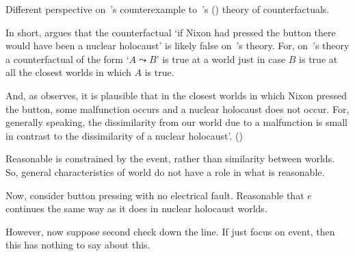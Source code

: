 \begin{note}
  Different perspective on~\citeauthor{Fine:1975tj}'s counterexample to~\citeauthor{Lewis:1973th}'s (\citeyear{Lewis:1973th}) theory of counterfactuals.

  In short, \citeauthor{Fine:1975tj} argues that the counterfactual `if Nixon had pressed the button there would have been a nuclear holocaust' is likely false on~\citeauthor{Lewis:1973th}'s theory.
  For, on~\citeauthor{Lewis:1973th}'s theory a counterfactual of the form `\(A \leadsto B\)' is true at a world just in case \(B\) is true at all the closest worlds in which \(A\) is true.

  And, as \citeauthor{Fine:1975tj} observes, it is plausible that in the closest worlds in which Nixon pressed the button, some malfunction occurs and a nuclear holocaust does not occur.
  For, generally speaking, the dissimilarity from our world due to a malfunction is small in contrast to the dissimilarity of a nuclear holocaust'.
  (\citeyear[452]{Fine:1975tj})

  Reasonable is constrained by the event, rather than similarity between worlds.
  So, general characteristics of world do not have a role in what is reasonable.

  Now, consider button pressing with no electrical fault.
  Reasonable that \(e\) continues the same way as it does in nuclear holocaust worlds.

  However, now suppose second check down the line.
  If just focus on event, then this has nothing to say about this.
\end{note}

